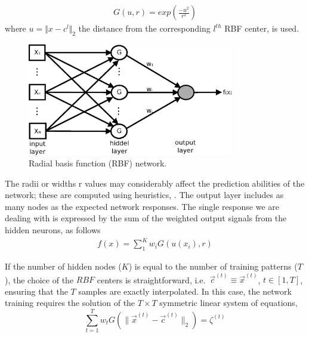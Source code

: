 \begin{eqnarray}
	G(u,r)=exp(\frac{-u^2}{r^2})
	\label{RBFa}
\end{eqnarray}  
where $u=\Vert x-c^l \Vert_2$ the distance from the corresponding $l^{th}$ RBF center, is used.

\begin{figure}[h!]
\centering
\includegraphics[width=90mm]{RBF.eps} 
\caption{Radial basis function (RBF) network.}
\label{rbf1}
\end{figure}

The radii or widths r values may considerably affect the prediction abilities of the network; these are computed using heuristics, \cite{Hayk1999}. The output layer includes as many nodes as the expected network responses. The single response we are dealing with is expressed by the sum of the weighted output signals from the hidden neurons, as follows             
\begin{eqnarray}
	f(x)=\sum _1^K w_i G(u(x_i),r)
\label{response}
\end{eqnarray}  

If the number of hidden nodes ($K$) is equal to the number of training patterns ($T$), the choice of the $RBF$ centers is straightforward, i.e.\
$\vec{c}^{(t)}\!\equiv\!\vec{x}^{(t)}$, $t\!\in\![1,T]$, ensuring
that the $T$ samples are exactly interpolated. 
In this case, the network training requires the solution of the $T\!\times\!T$ symmetric linear system of equations, 
%
\begin{equation}
    \sum_{t=1}^{T} w_t G(\|\vec{x}^{(t)}-\vec{c}^{(t)}\|_2)=
    \zeta^{(t)}
    \nonumber
\end{equation}

